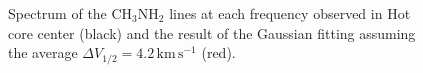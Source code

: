 \begin{figure}[H]
\begin{center}
\label{fig:spec}
\caption{Spectrum of the CH$_3$NH$_2$ lines at each frequency observed in Hot core center (black) 
 and the result of the Gaussian fitting assuming the average $\Delta V_{1/2} = 4.2\, \mathrm{km\,s^{-1}}$ (red).}
\end{center}
\end{figure}
